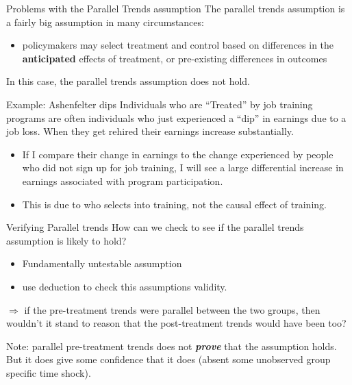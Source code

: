 \documentclass[
  ignorenonframetext,
]{beamer}
\providecommand{\tightlist}{%
  \setlength{\itemsep}{0pt}\setlength{\parskip}{0pt}}
\begin{document}
\begin{frame}{Problems with the Parallel Trends assumption}
\protect\hypertarget{problems-with-the-parallel-trends-assumption}{}
The parallel trends assumption is a fairly big assumption in many
circumstances:

\begin{itemize}
\tightlist
\item
  policymakers may select treatment and control based on differences in
  the \textbf{anticipated} effects of treatment, or pre-existing
  differences in outcomes
\end{itemize}

In this case, the parallel trends assumption does not hold.
\end{frame}

\begin{frame}{Example: Ashenfelter dips}
\protect\hypertarget{example-ashenfelter-dips}{}
Individuals who are ``Treated'' by job training programs are often
individuals who just experienced a ``dip'' in earnings due to a job
loss. When they get rehired their earnings increase substantially.

\begin{itemize}
\item
  If I compare their change in earnings to the change experienced by
  people who did not sign up for job training, I will see a large
  differential increase in earnings associated with program
  participation.
\item
  This is due to who selects into training, not the causal effect of
  training.
\end{itemize}
\end{frame}

\begin{frame}{Verifying Parallel trends}
\protect\hypertarget{verifying-parallel-trends}{}
How can we check to see if the parallel trends assumption is likely to
hold?

\begin{itemize}
\item
  Fundamentally untestable assumption
\item
  use deduction to check this assumptions validity.
\end{itemize}

\(\Rightarrow\) if the pre-treatment trends were parallel between the
two groups, then wouldn't it stand to reason that the post-treatment
trends would have been too?

Note: parallel pre-treatment trends does not \textbf{\textit{prove}}
that the assumption holds. But it does give some confidence that it does
(absent some unobserved group specific time shock).
\end{frame}
\end{document}
